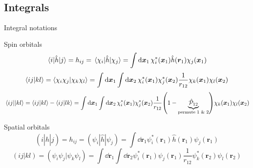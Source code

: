 \documentclass[aspectratio=169,9pt]{beamer}
\newcommand{\br}{\boldsymbol{r}}
\newcommand{\bx}{\boldsymbol{x}}
\newcommand{\hh}{\hat{h}}
\newcommand{\chP}{\Hat{\mathcal{P}}}
\begin{document}
\subsection{Integrals}
\begin{frame}{Integral notations}
	\begin{block}{Spin orbitals}
		\begin{equation}
			\mel{i}{\hh}{j} = h_{ij} = \mel{\chi_i}{\hh}{\chi_j} = \int \dd{\bx_1} \chi_i^*(\bx_1) \hh(\br_1) \chi_j(\bx_1)
		\end{equation}
		\begin{equation}
			\braket{ij}{kl} 
			= \braket{\chi_i \chi_j}{\chi_k \chi_l}
			= \int \dd{\bx_1} \int \dd{\bx_2} \chi_i^*(\bx_1) \chi_j^*(\bx_2) \frac{1}{r_{12}} \chi_k(\bx_1) \chi_l(\bx_2)
		\end{equation}
		\begin{equation}
			\mel{ij}{}{kl} 
			= \braket{ij}{kl} - \braket{ij}{lk} 
			= \int \dd{\bx_1} \int \dd{\bx_2} \chi_i^*(\bx_1) \chi_j^*(\bx_2) \frac{1}{r_{12}} \qty(1 - \underbrace{\chP_{12}}_{\text{permute 1 \& 2}}) \chi_k(\bx_1) \chi_l(\bx_2)
		\end{equation}
	\end{block}
	\begin{block}{Spatial orbitals}
		\begin{equation}
			(i|\hh|j) = h_{ij} = (\psi_i|\hh|\psi_j) = \int \dd{\br_1} \psi_i^*(\br_1) \hh(\br_1) \psi_j(\br_1) 
		\end{equation}
		\begin{equation}
			(ij|kl) 
			= (\psi_i \psi_j|\psi_k \psi_l)
			= \int \dd{\br_1} \int \dd{\br_2} \psi_i^*(\br_1) \psi_j(\br_1) \frac{1}{r_{12}} \psi_k^*(\br_2) \psi_l(\br_2) 
		\end{equation}
	\end{block}
\end{frame}
\end{document}
